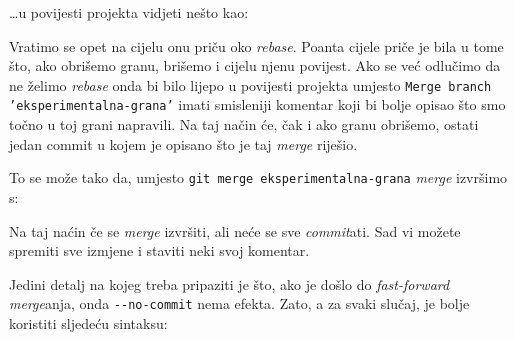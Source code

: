 

\dots{}u povijesti projekta vidjeti nešto kao:



Vratimo se opet na cijelu onu priču oko \emph{rebase}.
Poanta cijele priče je bila u tome što, ako obrišemo granu, brišemo i cijelu njenu povijest.
Ako se već odlučimo da ne želimo \emph{rebase} onda bi bilo lijepo u povijesti projekta umjesto \texttt{Merge branch 'eksperimentalna-grana'} imati smisleniji komentar koji bi bolje opisao što smo točno u toj grani napravili.
Na taj način će, čak i ako granu obrišemo, ostati jedan commit u kojem je opisano što je taj \emph{merge} riješio.

To se može tako da, umjesto \verb+git merge eksperimentalna-grana+ \emph{merge} izvršimo s:


Na taj naćin če se \emph{merge} izvršiti, ali neće se sve \emph{commit}ati. 
Sad vi možete spremiti sve izmjene i staviti neki svoj komentar.

Jedini detalj na kojeg treba pripaziti je što, ako je došlo do \emph{fast-forward} \emph{merge}anja, onda \verb+--no-commit+ nema efekta.
Zato, a za svaki slučaj, je bolje koristiti sljedeću sintaksu:

